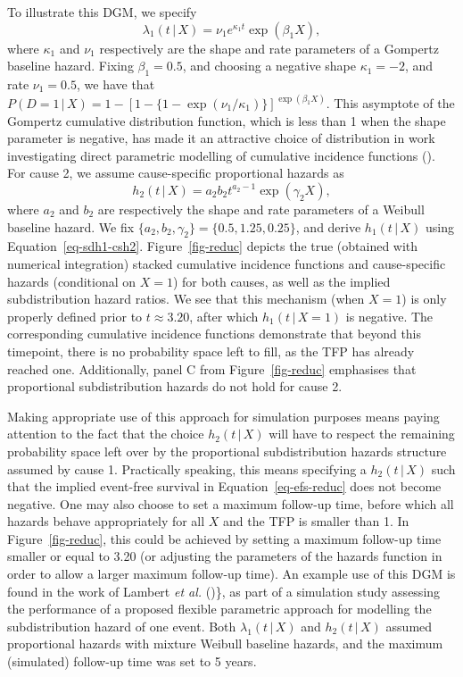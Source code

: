 \documentclass[
  letterpaper,
  DIV=11,
  numbers=noendperiod]{scrreprt}
\newcommand{\given}{\,|\,}
\begin{document}
To illustrate this DGM, we specify \begin{equation*}
    \lambda_1(t \given X) = \nu_1 e^{\kappa_1 t} \exp(\beta_1 X),
\end{equation*} where \(\kappa_1\) and \(\nu_1\) respectively are the
shape and rate parameters of a Gompertz baseline hazard. Fixing
\(\beta_1 = 0.5\), and choosing a negative shape \(\kappa_1 = -2\), and
rate \(\nu_1 = 0.5\), we have that
\(P(D = 1 \given X) = 1 - [1 - \{1 - \exp(\nu_1/\kappa_1)\}]^{\exp(\beta_1 X)}\).
This asymptote of the Gompertz cumulative distribution function, which
is less than 1 when the shape parameter is negative, has made it an
attractive choice of distribution in work investigating direct
parametric modelling of cumulative incidence functions
(). For cause 2, we assume cause-specific proportional hazards as
\begin{equation*}
    h_2(t \given X) = a_2 b_2t^{a_2 - 1} \exp(\gamma_2 X),
\end{equation*} where \(a_2\) and \(b_2\) are respectively the shape and
rate parameters of a Weibull baseline hazard. We fix
\(\{a_2, b_2, \gamma_2\} = \{0.5, 1.25, 0.25\}\), and derive
\(h_1(t \given X)\) using Equation~\ref{eq-sdh1-csh2}.
Figure~\ref{fig-reduc} depicts the true (obtained with numerical
integration) stacked cumulative incidence functions and cause-specific
hazards (conditional on \(X = 1\)) for both causes, as well as the
implied subdistribution hazard ratios. We see that this mechanism (when
\(X = 1\)) is only properly defined prior to \(t \approx 3.20\), after
which \(h_1(t \given X = 1)\) is negative. The corresponding cumulative
incidence functions demonstrate that beyond this timepoint, there is no
probability space left to fill, as the TFP has already reached one.
Additionally, panel C from Figure~\ref{fig-reduc} emphasises that
proportional subdistribution hazards do not hold for cause 2.

Making appropriate use of this approach for simulation purposes means
paying attention to the fact that the choice \(h_2(t \given X)\) will
have to respect the remaining probability space left over by the
proportional subdistribution hazards structure assumed by cause 1.
Practically speaking, this means specifying a \(h_2(t \given X)\) such
that the implied event-free survival in Equation~\ref{eq-efs-reduc} does
not become negative. One may also choose to set a maximum follow-up
time, before which all hazards behave appropriately for all \(X\) and
the TFP is smaller than 1. In Figure~\ref{fig-reduc}, this could be
achieved by setting a maximum follow-up time smaller or equal to 3.20
(or adjusting the parameters of the hazards function in order to allow a
larger maximum follow-up time). An example use of this DGM is found in
the work of Lambert \emph{et al.}
()\}, as part
of a simulation study assessing the performance of a proposed flexible
parametric approach for modelling the subdistribution hazard of one
event. Both \(\lambda_1(t \given X)\) and \(h_2(t \given X)\) assumed
proportional hazards with mixture Weibull baseline hazards, and the
maximum (simulated) follow-up time was set to 5 years.
\end{document}
